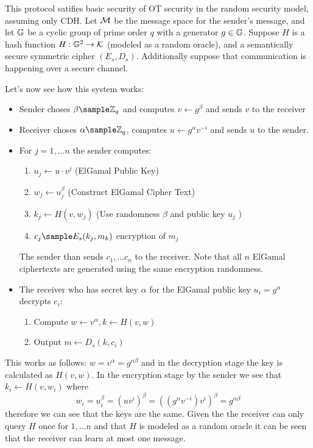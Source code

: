 This protocol satifies basic security of OT security in the random security model, assuming only CDH. Let \(\mathcal{M}\) be the message space for the sender's message, and let \(\mathbb{G}\) be a cyclic group of prime order \(q\) with a generator \( g \in \mathbb{G}\). Suppose \(H\) is a hash function \(H: \mathbb{G}^{2} \to \mathcal{K}\) (modeled as a random oracle), and a semantically secure symmetric cipher \((E_s, D_s)\). Additionally suppose that communication is happening over a secure channel. 

Let's now see how this system works: 

\begin{itemize}
    \item Sender choses \(\beta  \sample \Z_q\) and computes \( v \gets g^{\beta }\) and sends \(v\) to the receiver 
    \item Receiver choses \(\alpha \sample \Z_q\), computes \(u \gets g^{\alpha }v^{-i}\) and sends \(u\) to the sender. 
    \item For \(j=1,\ldots n \) the sender computes: 
    \begin{enumerate}
        \item \(u_j \gets u \cdot v^j\) (ElGamal Public Key)
        \item \(w_j \gets u^{\beta }_j\) (Construct ElGamal Cipher Text)
        \item \(k_j \gets H(v, w_j)\)  (Use randomness \(\beta \) and public key \(u_j\)  )
        \item \(c_j \sample E_s(k_j, m_k)\) encryption of \(m_j\)  
    \end{enumerate}    
    The sender than sends \(c_1, \ldots c_n \) to the receiver. Note that all \(n\) ElGamal ciphertexts are generated using the same encryption randomness.     
    \item The receiver who has secret key \(\alpha \) for the ElGamal public key \(u_i = g^\alpha \) decrypts \(c_i\): 
    \begin{enumerate}
        \item Compute \(w \gets v^\alpha, k \gets H(v, w) \)
        \item Output \(m \gets D_s(k, c_i)\)  
    \end{enumerate}   
\end{itemize}

This works as follows: \(w = v^\alpha  = g^{\alpha \beta }\) and in the decryption stage the key is calculated as \(H(v, w)\). In the encryption stage by the sender we see that \(k_i \gets H(v, w_i)\) where 
\[
     w_i = u_i^\beta  = (uv^i)^\beta = ((g^\alpha v^{-i})v^i)^\beta = g^{\alpha \beta } 
\]  
therefore we can see that the keys are the same. Given the the receiver can only query \(H\) once for \(1, \ldots  n \) and that \(H\) is modeled as a random oracle it can be seen that the receiver can learn at most one message.

